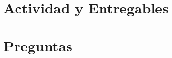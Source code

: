 \documentclass[12pt]{article} %
\begin{document}
\hypersetup{pageanchor=false}

\hypersetup{pageanchor=true}



\section*{Actividad y Entregables}







\section*{Preguntas}
\begin{enumerateColor}
    \item \leavevmode
    \item \leavevmode
    \item \leavevmode
    \item \leavevmode
    \item \leavevmode
    \item \leavevmode
    \item \leavevmode
    \item \leavevmode
    \item \leavevmode

\end{enumerateColor}
\end{document}

